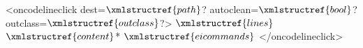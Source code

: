 <oncodelineclick dest=$\xmlstructref{path}$? autoclean=$\xmlstructref{bool}$? outclass=$\xmlstructref{outclass}$?>
  $\xmlstructref{lines}$
  $\xmlstructref{content}$*
  $\xmlstructref{eicommands}$
</oncodelineclick>

